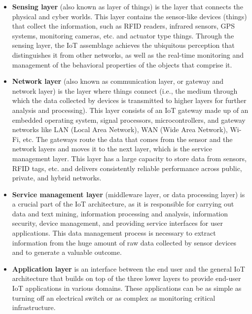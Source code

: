 \documentclass[
  letterpaper,
  DIV=11,
  numbers=noendperiod]{scrreprt}
\begin{document}
\begin{itemize}
\item
  \textbf{Sensing layer} (also known as layer of things) is the layer
  that connects the physical and cyber worlds. This layer contains the
  sensor-like devices (things) that collect the information, such as
  RFID readers, infrared sensors, GPS systems, monitoring cameras, etc.
  and actuator type things. Through the sensing layer, the IoT
  assemblage achieves the ubiquitous perception that distinguishes it
  from other networks, as well as the real-time monitoring and
  management of the behavioral properties of the objects that comprise
  it.
\item
  \textbf{Network layer} (also known as communication layer, or gateway
  and network layer) is the layer where things connect (i.e., the medium
  through which the data collected by devices is transmitted to higher
  layers for further analysis and processing). This layer consists of an
  IoT gateway made up of an embedded operating system, signal
  processors, microcontrollers, and gateway networks like LAN (Local
  Area Network), WAN (Wide Area Network), Wi-Fi, etc. The gateways route
  the data that comes from the sensor and the network layers and moves
  it to the next layer, which is the service management layer. This
  layer has a large capacity to store data from sensors, RFID tags, etc.
  and delivers consistently reliable performance across public, private,
  and hybrid networks.
\item
  \textbf{Service management layer} (middleware layer, or data
  processing layer) is a crucial part of the IoT architecture, as it is
  responsible for carrying out data and text mining, information
  processing and analysis, information security, device management, and
  providing service interfaces for user applications. This data
  management process is necessary to extract information from the huge
  amount of raw data collected by sensor devices and to generate a
  valuable outcome.
\item
  \textbf{Application layer} is an interface between the end user and
  the general IoT architecture that builds on top of the three lower
  layers to provide end-user IoT applications in various domains. These
  applications can be as simple as turning off an electrical switch or
  as complex as monitoring critical infrastructure.
\end{itemize}
\end{document}
